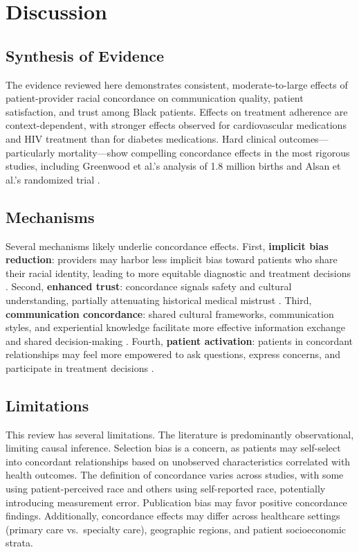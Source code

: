 \documentclass[12pt]{article}
\begin{document}
\section{Discussion}

\subsection{Synthesis of Evidence}

The evidence reviewed here demonstrates consistent, moderate-to-large effects of patient-provider racial concordance on communication quality, patient satisfaction, and trust among Black patients. Effects on treatment adherence are context-dependent, with stronger effects observed for cardiovascular medications and HIV treatment than for diabetes medications. Hard clinical outcomes---particularly mortality---show compelling concordance effects in the most rigorous studies, including Greenwood et al.'s analysis of 1.8 million births \citep{greenwood2020} and Alsan et al.'s randomized trial \citep{alsan2019}.

\subsection{Mechanisms}

Several mechanisms likely underlie concordance effects. First, \textbf{implicit bias reduction}: providers may harbor less implicit bias toward patients who share their racial identity, leading to more equitable diagnostic and treatment decisions \citep{hall2015, penner2010}. Second, \textbf{enhanced trust}: concordance signals safety and cultural understanding, partially attenuating historical medical mistrust \citep{gamble1997, boulware2003}. Third, \textbf{communication concordance}: shared cultural frameworks, communication styles, and experiential knowledge facilitate more effective information exchange and shared decision-making \citep{street2008, cooper2003}. Fourth, \textbf{patient activation}: patients in concordant relationships may feel more empowered to ask questions, express concerns, and participate in treatment decisions \citep{charles1997}.

\subsection{Limitations}

This review has several limitations. The literature is predominantly observational, limiting causal inference. Selection bias is a concern, as patients may self-select into concordant relationships based on unobserved characteristics correlated with health outcomes. The definition of concordance varies across studies, with some using patient-perceived race and others using self-reported race, potentially introducing measurement error. Publication bias may favor positive concordance findings. Additionally, concordance effects may differ across healthcare settings (primary care vs.\ specialty care), geographic regions, and patient socioeconomic strata.
\end{document}
